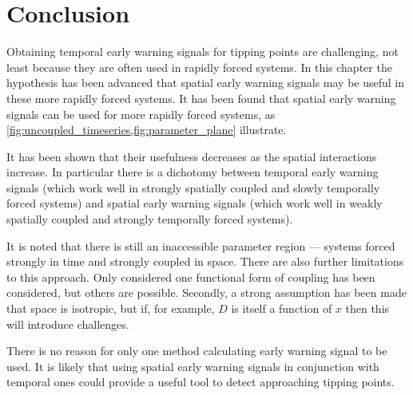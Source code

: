 \section{Conclusion}

Obtaining temporal early warning signals for tipping points are challenging, not least because they are often used in rapidly forced systems.
In this chapter the hypothesis has been advanced that spatial early warning signals may be useful in these more rapidly forced systems.
It has been found that spatial early warning signals can be used for more rapidly forced systems, as \cref{fig:uncoupled_timeseries,fig:parameter_plane}
illustrate.

It has been shown that their usefulness decreases as the spatial interactions increase.
In particular there is a dichotomy between temporal early warning signals (which work well in strongly spatially coupled and slowly temporally forced systems)
and spatial early warning signals (which work well in weakly spatially coupled and strongly temporally forced systems).

It is noted that there is still an inaccessible parameter region --- systems forced strongly in time and strongly coupled in space. There are also further limitations
to this approach.  Only considered one functional form of coupling has been considered, but others are possible. Secondly, a strong assumption has been made that space is isotropic,
but if, for example, $D$ is itself a function of $x$ then this will introduce challenges.

There is no reason for only one method calculating early warning signal to be used. It is likely that using spatial early warning signals in conjunction with
temporal ones could provide a useful tool to detect approaching tipping points.
